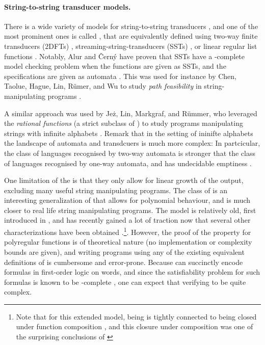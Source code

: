 \paragraph{String-to-string transducer models.} There is a wide variety of
models for string-to-string transducers \cite{MUSC19}, and one of the most
prominent ones is called , that are
equivalently defined using two-way finite transducers (2DFTs)
\cite{RASCO59}, streaming-string-transducers (SSTs) \cite{ALUR11}, or linear
regular list functions \cite{BDK18}. Notably, Alur and Černý have proven
that SSTs have a \PSPACE-complete model checking problem when the functions are
given as SSTs, and the specifications are given as automata
\cite[Theorem 13]{ALCE11}. This was used for instance by Chen, Taolue, Hague,
Lin, Rümer, and Wu to study \emph{path feasibility} in string-manipulating
programs \cite{CHLRW19}.

A similar approach was used by Jeż, Lin, Markgraf, and Rümmer, who leveraged
the \emph{rational functions} (a strict subclass of ) to study programs manipulating strings with infinite alphabets
\cite{KAFR94}. Remark that in the setting of ininifte alphabets the landscape
of automata and transdcuers is much more complex: In partcicular, the class of
languages recognised by two-way automata is stronger that the class of
languages recognised by one-way automata, and has undecidable emptiness
\cite[Figure 1.1]{BOJA19}.

\AP One limitation of the  is that they only 
allow for linear growth of the output, excluding many useful string manipulating 
programs. The class of  is an interesting 
generalization of  that allows for polynomial behaviour, 
and is much closer to real life string manipulating programs. The model 
is relatively old, first introduced in \cite{ENMA02},
and has recently gained a lot of traction now that
several other characterizations have been obtained
\cite{bojanczyk2018polyregular,bojanczyk2019string}.\footnote{Note that for this extended model, being
   is tightly connected to being closed under
function composition \cite[Proposition III.3]{FIRELH25}, and this closure under
composition was one of the surprising conclusions of
\cite{bojanczyk2018polyregular}}. However, the proof of the  property for polyregular functions is of theoretical nature (no
implementation or complexity bounds are given), and writing programs using any
of the existing equivalent definitions of  is
cumbersome and error-prone. Because  can succinctly
encode formulas in first-order logic on words, and
since the satisfiability problem for such formulas is known to be
\TOWER-complete \cite[Theorem 13.5]{REINH02}, one can expect that verifying
 to be quite complex.

